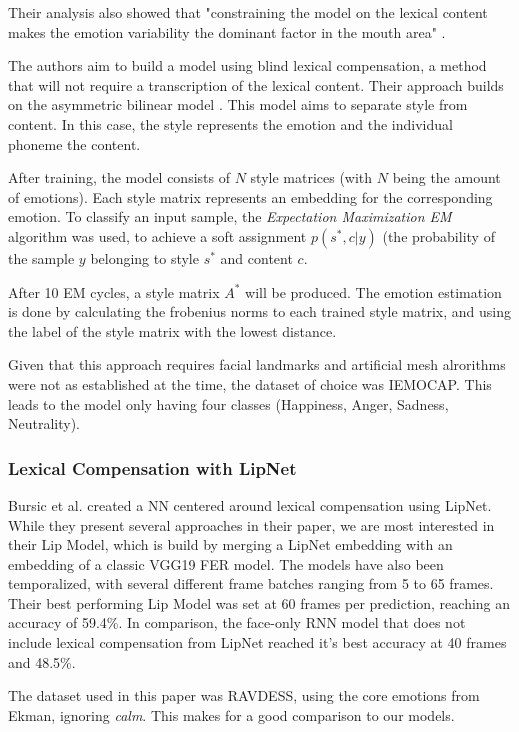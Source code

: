 Their analysis also showed that "constraining the model on the lexical content makes the emotion variability the dominant factor in the mouth area" \cite{mariooryad2015facial} \cite{mariooryad2012factorizing}.

The authors aim to build a model using blind lexical compensation, a method that will not require a transcription of the lexical content. Their approach builds on the asymmetric bilinear model \cite{tenenbaum1997separating} \cite{tenenbaum2000separating}. This model aims to separate style from content. In this case, the style represents the emotion and the individual phoneme the content.

After training, the model consists of $N$ style matrices (with $N$ being the amount of emotions). Each style matrix represents an embedding for the corresponding emotion. To classify an input sample, the \emph{Expectation Maximization EM} algorithm was used, to achieve a soft assignment $p(s^{*}, c |y)$ (the probability of the sample $y$ belonging to style $s^{*}$ and content $c$.

After 10 EM cycles, a style matrix $A^{*}$ will be produced. The emotion estimation is done by calculating the frobenius norms to each trained style matrix, and using the label of the style matrix with the lowest distance.

Given that this approach requires facial landmarks and artificial mesh alrorithms were not as established at the time, the dataset of choice was IEMOCAP. This leads to the model only having four classes (Happiness, Anger, Sadness, Neutrality).

\subsubsection{Lexical Compensation with LipNet}
Bursic et al. \cite{bursic2020improving} created a NN centered around lexical compensation using LipNet. While they present several approaches in their paper, we are most interested in their Lip Model, which is build by merging a LipNet embedding with an embedding of a classic VGG19 FER model. The models have also been temporalized, with several different frame batches ranging from 5 to 65 frames. Their best performing Lip Model was set at 60 frames per prediction, reaching an accuracy of 59.4\%. In comparison, the face-only RNN model that does not include lexical compensation from LipNet reached it's best accuracy at 40 frames and 48.5\%.

The dataset used in this paper was RAVDESS, using the core emotions from Ekman, ignoring \emph{calm}. This makes for a good comparison to our models.

